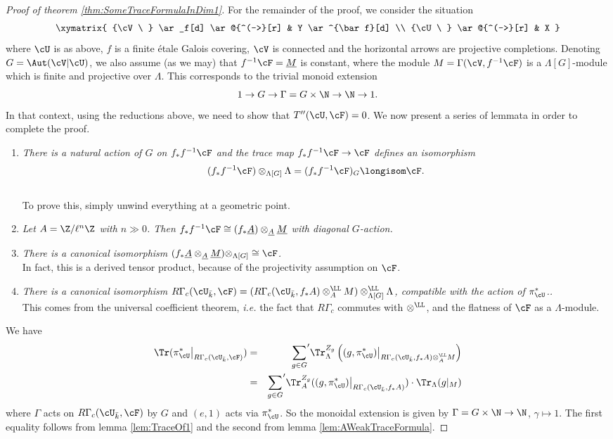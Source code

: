 \begin{proof}[Proof of theorem \ref{thm:SomeTraceFormulaInDim1}]
For the remainder of the proof, we consider the situation
$$
\xymatrix{
{\cV \ } \ar_f[d] \ar@{^(->}[r] & Y \ar^{\bar f}[d] \\	
{\cU \ } \ar@{^(->}[r] & X
}
$$
where $\cU$ is as above, $f$ is a finite \'etale Galois covering, $\cV$ is connected and the horizontal arrows are projective completions. Denoting $G=\Aut(\cV|\cU)$, we also assume (as we may) that $f^{-1}\cF =\underline M$ is constant, where the module $M = \Gamma(\cV, f^{-1}\cF)$ is a $\Lambda[G]$-module which is finite and projective over $\Lambda$. This corresponds to the trivial monoid extension 
$$
1\to G\to \Gamma=G\times \N\to \N\to 1.
$$
In that context, using the reductions above, we need to show that $T''(\cU,\cF)=0$. We now present a series of lemmata in order to complete the proof.
\begin{enumerate}[\it 1.]
\item
{\it There is a natural action of $G$ on $f_*f^{-1}\cF$ and the trace map $f_*f^{-1}\cF\to \cF$ defines an isomorphism
$$
(f_*f^{-1}\cF)\otimes_{\Lambda[G]} \Lambda=(f_*f^{-1}\cF)_G \longisom \cF.
$$
}
\\
To prove this, simply unwind everything at a geometric point.
\item
{\it
Let $A=\Z/\ell^n \Z$ with $n\gg 0$. Then $f_*f^{-1}\cF \cong (f_*\underline A)\otimes_{\underline A} \underline M$ with diagonal $G$-action.
}
\item
{\it
There is a canonical isomorphism $(f_* \underline A\otimes_{\underline A} \underline M)\otimes_{\Lambda[G]} \cong\cF$.
}\\
In fact, this is a derived tensor product, because of the projectivity assumption on $\cF$.
\item
{\it
There is a canonical isomorphism $R\Gamma_c(\cU_{\bar k}, \cF) = (R\Gamma_c(\cU_{\bar k}, f_*A)\otimes_A^\LL M)\otimes_{\Lambda[G]}^\LL \Lambda$, compatible with the action of $\pi^*_\cU$..
}
\\
This comes from the universal coefficient theorem, {\it i.e.} the fact that $R\Gamma_c$ commutes with $\otimes^\LL$, and the flatness of $\cF$ as a $\Lambda$-module. 
\end{enumerate}

We have
\begin{eqnarray*}
\Tr(\pi_\cU^*\big|_{R\Gamma_c(\cU_{\bar k}, \cF)}) & = &  {\sum_{g\in G}}'\Tr_{\Lambda}^{Z_g}\left((g,\pi_\cU^*)\big|_{R\Gamma_c(\cU_{\bar k}, f_*A)\otimes_A^\LL M}\right)\\
& = &  {\sum_{g\in G}}' \Tr_A^{Z_g}((g, \pi_\cU^*)\big|_{R\Gamma_c(\cU_{\bar k}, f_*A)})\cdot \Tr_\Lambda(g|_M)
\end{eqnarray*}
where $\Gamma$ acts on $R\Gamma_c(\cU_{\bar k}, \cF)$ by $G$ and $(e, 1)$ acts via $\pi_\cU^*$. So the monoidal extension is given by $\Gamma = G \times \N \to \N$, $\gamma \mapsto 1$. The first equality follows from lemma \ref{lem:TraceOf1} and the second from lemma \ref{lem:AWeakTraceFormula}.


\end{proof}

